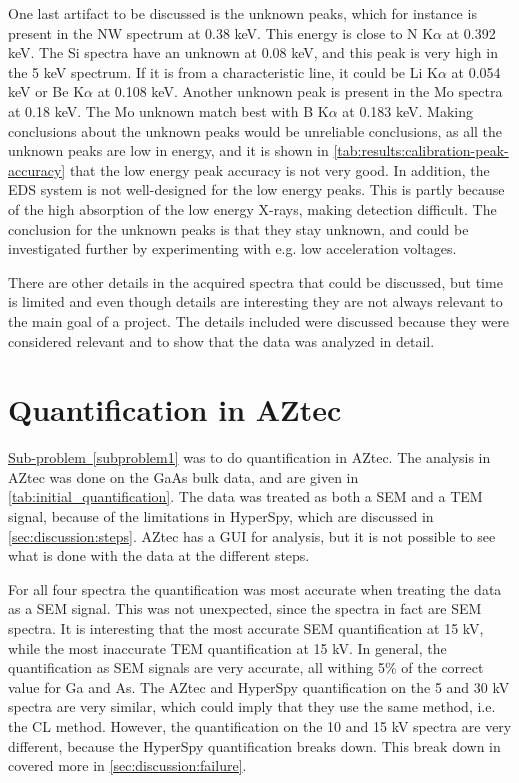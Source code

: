 One last artifact to be discussed is the unknown peaks, which for instance is present in the NW spectrum at 0.38 keV.
This energy is close to N K$\alpha$ at 0.392 keV.
The Si spectra have an unknown at 0.08 keV, and this peak is very high in the 5 keV spectrum.
If it is from a characteristic line, it could be Li K$\alpha$ at 0.054 keV or Be K$\alpha$ at 0.108 keV.
Another unknown peak is present in the Mo spectra at 0.18 keV.
The Mo unknown match best with B K$\alpha$ at 0.183 keV.
Making conclusions about the unknown peaks would be unreliable conclusions, as all the unknown peaks are low in energy, and it is shown in \cref{tab:results:calibration-peak-accuracy} that the low energy peak accuracy is not very good.
In addition, the EDS system is not well-designed for the low energy peaks.
This is partly because of the high absorption of the low energy X-rays, making detection difficult.
The conclusion for the unknown peaks is that they stay unknown, and could be investigated further by experimenting with e.g. low acceleration voltages.


There are other details in the acquired spectra that could be discussed, but time is limited and even though details are interesting they are not always relevant to the main goal of a project.
The details included were discussed because they were considered relevant and to show that the data was analyzed in detail.









\section{Quantification in AZtec}
\label{sec:discussion:az_quantification}

\hyperref[subproblem1]{Sub-problem~\ref*{subproblem1}} was to do quantification in AZtec.
The analysis in AZtec was done on the GaAs bulk data, and are given in \cref{tab:initial_quantification}.
The data was treated as both a SEM and a TEM signal, because of the limitations in HyperSpy, which are discussed in \cref{sec:discussion:steps}.
AZtec has a GUI for analysis, but it is not possible to see what is done with the data at the different steps.

For all four spectra the quantification was most accurate when treating the data as a SEM signal.
This was not unexpected, since the spectra in fact are SEM spectra.
It is interesting that the most accurate SEM quantification at 15 kV, while the most inaccurate TEM quantification at 15 kV.
In general, the quantification as SEM signals are very accurate, all withing 5\% of the correct value for Ga and As.
The AZtec and HyperSpy quantification on the 5 and 30 kV spectra are very similar, which could imply that they use the same method, i.e. the CL method.
However, the quantification on the 10 and 15 kV spectra are very different, because the HyperSpy quantification breaks down.
This break down in covered more in \cref{sec:discussion:failure}.

